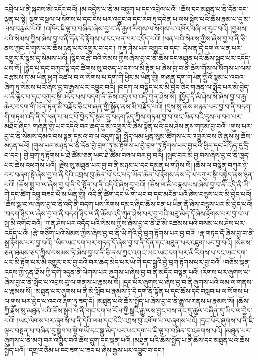 འབྲེལ་པ་ནི་སྐབས་མི་འདོར་བའོ། །མ་འདྲེས་པ་ནི་མ་འཁྲུག་པ་དང་འབྲེལ་པའོ། །ཆོས་དང་མཐུན་པ་ནི་དོན་དང་ལྡན་པ་སྟེ། སྡུག་བསྔལ་ལ་སོགས་པ་དང་ངེས་པར་འབྱུང་བ་དང་རབ་ཏུ་དབེན་པ་ལས་སྐྱེས་པའི་ཆོས་རྣམ་པ་དུ་མ་ལས་བརྩམ་པའོ། །འཁོར་ཇི་ལྟ་བ་བཞིན་ཞེས་བྱ་བ་ནི་རྒྱལ་རིགས་ལ་སོགས་པ་འཁོར་བཞི་ལ་རུང་བའོ། །བྱམས་པའི་སེམས་ཀྱིས་ཞེས་བྱ་བ་ནི་དོན་དེ་རྟོགས་པ་དང་ཕན་པར་འདོད་པའོ། །ཕན་པའི་སེམས་ཀྱིས་ཞེས་བྱ་བ་ནི་ཅི་ནས་ཀྱང་དེ་གུས་པར་ཆོས་ཉན་པར་འགྱུར་བ་དང་། ཀུན་ཤེས་པར་འགྱུར་བ་དང་། དེས་ན་དེ་དག་ལ་ཕན་པར་འགྱུར་རོ་སྙམ་དུ་སེམས་པའོ། །སྙིང་བརྩེ་བའི་སེམས་ཀྱིས་ཞེས་བྱ་བ་ནི་ཆོས་དང་མཐུན་པའི་ཆོས་སྒྲུབ་པར་འདོད་པས་སོ། །རྙེད་པ་དང་བཀུར་སྟི་དང་ཚིགས་སུ་བཅད་པ་དག་ལ་མི་རྟེན་པ་ཞེས་བྱ་བ་ནི་ཆོས་གོས་ལ་སོགས་པ་ལས་བརྩམས་ཏེ་མ་ཡིན་ཕྱག་འཚལ་བ་ལ་སོགས་པ་དག་གི་ཕྱིར་མ་ཡིན་གྱི། གཞན་དག་གཡེན་སྤྱོའོ་སྙམ་པ་འབའ་ཞིག་ཏུ་སེམས་པའོ་ཞེས་བྱ་བ་རྒྱས་པར་འབྱུང་བའོ། །བདག་ལ་བསྟོད་པར་མི་བྱེད་ཅིང་གཞན་ལ་སྨོད་པར་མི་བྱེད་པ་ནི་རྙེད་པ་དང་བཀུར་སྟི་འདོད་པས་བདག་ནི་ཆོས་འདུལ་བ་འདི་ཀུན་ཤེས་སོ། །ཁྱོད་ནི་མི་ཤེས་སོ་ཞེས་བྱ་བ་རྒྱ་ཆེར་བདག་གི་ཡོན་ཏན་མི་བརྗོད་ཅིང་གཞན་གྱི་སྐྱོན་ནས་མི་བརྗོད་པའོ། །དུས་སུ་ཆོས་མཉན་པར་བྱ་བ་ནི་བདག་གི་གཏམ་འདི་ནི་དེ་ཕན་པ་མང་པོ་བྱེད་དོ་སྙམ་དུ་བདག་ཉིད་ཀྱིས་གཏམ་བྱ་བ་གང་ཡིན་པའི་དུས་ལ་བབ་པར་མཐོང་ཞིང་། གཞན་གྱི་ཡང་འདིའི་བར་ཆད་དུ་མི་འགྱུར་རོ་ཞེས་སྟོན་པའི་དུས་ཤེས་ནས་གཏམ་བྱ་བའོ། །གུས་པར་བྱ་བ་ནི་སེམས་དམའ་བས་སྟན་དམའ་བ་ལ་འདུག་སྟེ། སྤྱོད་ལམ་ཕུན་སུམ་ཚོགས་པར་འགྱུར་བས་ཅི་ནུས་སུ་ཆོས་མཉན་པའོ། །གུས་པར་མཉན་པ་ནི་དོན་བྱེ་བྲག་ཏུ་མ་རྟོགས་པ་བྱེ་བྲག་ཏུ་རྟོགས་པར་བྱ་བའི་ཕྱིར་དང་པོ་ཉིད་དུ་དྲི་བ་དང་། བྱེ་བྲག་ཏུ་རྟོགས་པ་ཐེ་ཚོམ་ཅན་ཡང་ཐེ་ཚོམ་བསལ་བར་བྱ་བའོ། །སྤང་བར་མི་བྱ་བས་ཞེས་བྱ་བ་ནི་ཁྱད་པར་ཆེས་འཕགས་པའོ། །རྗེས་སུ་མཐུན་པར་བྱ་བ་ནི་མཉམ་པ་དང་དམན་པ་གཉིས་སོ། །ཆོས་ལ་བསྙེན་བཀུར་ཉེ་བར་བཞག་སྟེ་ཞེས་བྱ་བ་ནི་དེའི་འབྲས་བུ་ཆེན་པོ་དང་ཕན་ཡོན་ཆེན་པོ་རྟོགས་ནས་དེ་ལ་བཀུར་སྟི་བསྐྱེད་ནས་ཉན་པའོ། །ཆོས་སྨྲ་བ་ལ་ཞེས་བྱ་བ་ནི་དེ་སྟོན་པ་ནི་འདིའོ་ཞེས་བྱ་བའོ། །ཆོས་ལ་མི་བརྙས་པས་ཞེས་བྱ་བ་ནི་འདི་ནི་ཡི་གེ་དང་ཚིག་འབྲུ་བཟང་པོ་མ་ཡིན་གྱི། འདི་ནི་ཚིག་དང་ཡི་གེ་ཡང་བ་དང་མངོན་པའོ་ཞེས་བརྙས་པར་མི་བྱེད་པའོ། །ཆོས་སྨྲ་བ་ལ་ཞེས་བྱ་བ་ནི་འདི་ནི་བདག་པས་རིགས་དམའ་ཞིང་ཆོས་ངན་པ་ཡིན་ནོ་ཞེས་བརྙས་པར་མི་བྱེད་པའོ། །བདག་ཉིད་ལ་ཞེས་བྱ་བ་ནི་བདག་ཉིད་ལ་ནི་ཆོས་འདི་ཀུན་ཤེས་པར་བྱ་བའི་མཐུ་མེད་དོ་ཞེས་རྟོགས་པར་བྱ་བ་ལ་སྤ་མི་འགོང་བའོ། །ཀུན་ཤེས་པར་འདོད་པའི་སེམས་ཀྱིས་ཞེས་བྱ་བ་ནི་ཐོ་མི་འཚམས་པའི་བསམ་པས་ཤེས་པར་འདོད་པའོ། །རྩེ་གཅིག་པའི་སེམས་ཀྱིས་ཞེས་བྱ་བ་ནི་ཡི་གེའི་བྱེ་བྲག་རྟོགས་པར་བྱ་བའོ། །རྣ་གཏད་དོ་ཞེས་བྱ་བ་ནི་སྒྲ་རྟོགས་པར་བྱ་བའོ། །ཡིད་ཡང་དག་པར་གཏད་དོ་ཞེས་བྱ་བ་ནི་དོན་དང་མཐུན་པར་འཇུག་པར་བྱ་བའོ། །སེམས་ཅན་ཐམས་ཅད་ཀྱིས་བསམས་ཏེ་ཞེས་བྱ་བ་ནི་ཅི་ནས་ཀྱང་འགའ་ཡང་ཡང་དག་པར་མི་རིགས་པ་དང་ཡང་དག་པར་མི་རྟོག་པར་མི་འགྱུར་བར་བྱ་བའི་བར་ཆད་མེད་པར་ཡི་གེ་དང་སྒྲའི་བྱེ་བྲག་རྟོགས་པར་བྱ་བའོ། །བཅོམ་ལྡན་འདས་ཀྱི་ཉན་ཐོས་ཀྱི་དགེ་འདུན་ནི་ལེགས་པར་ཞུགས་པ་ཞེས་བྱ་བ་ནི་མདོར་བསྟན་པའོ། །རིགས་པར་ཞུགས་པ་ཞེས་བྱ་བ་ནི་སློབ་པ་འབྲས་བུ་ལ་གནས་པ་རྣམས་སོ། །དྲང་པོར་ཞུགས་པ་ཞེས་བྱ་བ་ནི་ཞུགས་པའི་ལམ་ལ་གནས་པ་རྣམས་སོ། །མཐུན་པར་ཞུགས་པ་ནི་མི་སློབ་པ་རྣམས་ཏེ་དེ་དག་ནི་སྟོན་པ་དང་ཆོས་དང་བསླབ་པ་ལ་སོགས་པ་ལ་གུས་པར་བྱེད་པ་འབའ་ཞིག་ཏུ་ཟད་དོ། །མཐུན་པའི་ཆོས་སྤྱོད་པ་ཞེས་བྱ་བ་ནི་རྒྱུ་ལ་གནས་པ་རྣམས་སོ། །ཆོས་ཀྱི་རྗེས་སུ་མཐུན་པའི་ཆོས་སྒྲུབ་པ་ནི་གང་དག་ཕ་རོལ་གྱི་སྒྲའི་རྒྱུ་ལས་བྱུང་བས་ནང་དུ་ཚུལ་བཞིན་དུ་ཡིད་ལ་བྱེད་པའོ། །ཡང་ལེགས་པར་ཞུགས་པ་ནི་དེའི་ལམ་དང་དེའི་འབྲས་བུ་འགོག་པ་ལ་ཞུགས་པའོ། །དྲང་པོར་ཞུགས་པ་ནི་ཇི་ལྟར་བསྟན་པ་བཞིན་དུ་སྒྲུབ་པ་སྟེ་གཡོ་དང་སྒྱུ་མེད་པར་ཡང་དག་པ་ཇི་ལྟ་བ་བཞིན་དུ་འཆགས་པའོ། །མཐུན་པར་ཞུགས་པ་ནི་མགུ་བར་འགྱུར་བའི་ཆོས་དྲུག་དང་ལྡན་པའོ། །མཐུན་པའི་ཆོས་སྤྱོད་པ་ནི་ཆོས་དང་མཐུན་པའི་ཆོས་སྤྱོད་པའོ། །དགྲ་བཅོམ་པ་དང་ཟག་པ་ཟད་པ་ཞེས་རྒྱས་པར་འབྱུང་བ་དང་། 